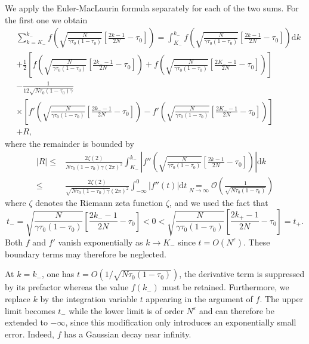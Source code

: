 \documentclass[pdflatex,sn-mathphys-num]{sn-jnl}
\theoremstyle{thmstyleone}
\numberwithin{equation}{section}
\begin{document}
We apply the Euler-MacLaurin formula separately for each of the two sums. For the first one we obtain
\begin{equation}
\begin{split}
&\sum_{k=K_-}^{k_-} f\left(\sqrt{\frac{N}{\gamma\tau_0(1-\tau_0)}}\left[\frac{2k-1}{2N}-\tau_0\right]\right)=\int_{K_-}^{k_-} f\left(\sqrt{\frac{N}{\gamma\tau_0(1-\tau_0)}}\left[\frac{2k-1}{2N}-\tau_0\right]\right)\mathrm{d}k\\
&+\frac{1}{2}\left[f\left(\sqrt{\frac{N}{\gamma\tau_0(1-\tau_0)}}\left[\frac{2k_--1}{2N}-\tau_0\right]\right)+f\left(\sqrt{\frac{N}{\gamma\tau_0(1-\tau_0)}}\left[\frac{2K_--1}{2N}-\tau_0\right]\right)\right]\\
&-\frac{1}{12\sqrt{N\tau_0(1-\tau_0)\gamma}}\\
&\times\left[f'\left(\sqrt{\frac{N}{\gamma\tau_0(1-\tau_0)}}\left[\frac{2k_--1}{2N}-\tau_0\right]\right)-f'\left(\sqrt{\frac{N}{\gamma\tau_0(1-\tau_0)}}\left[\frac{2K_--1}{2N}-\tau_0\right]\right)\right]\\
&+R,
\end{split}
\end{equation}
where the remainder is bounded by
\begin{equation}
\begin{split}
|R|\leq&\frac{2\zeta(2)}{N\tau_0(1-\tau_0)\gamma(2\pi)^2}\int_{K_-}^{k_-} \left|f''\left(\sqrt{\frac{N}{\gamma\tau_0(1-\tau_0)}}\left[\frac{2k-1}{2N}-\tau_0\right]\right)\right|\mathrm{d}k\\
\leq&\frac{2\zeta(2)}{\sqrt{N\tau_0(1-\tau_0)\gamma}(2\pi)^2}\int_{-\infty}^0\left|f''\left(t\right)\right|\mathrm{d}t\underset{N\to\infty}{=}\mathcal{O}\left(\frac{1}{\sqrt{N\tau_0(1-\tau_0)}}\right)
\end{split}
\end{equation}
where $\zeta$ denotes the Riemann zeta function $\zeta$, and we used the fact that
\begin{equation}\label{tpm.def}
t_-=\sqrt{\frac{N}{\gamma\tau_0(1-\tau_0)}}\left[\frac{2k_--1}{2N}-\tau_0\right]<0<\sqrt{\frac{N}{\gamma\tau_0(1-\tau_0)}}\left[\frac{2k_+-1}{2N}-\tau_0\right]=t_+.
\end{equation}
Both $f$ and $f'$ vanish exponentially as $k\to K_{-}$ since $t=O(N^\varepsilon)$. These boundary terms may therefore be neglected.


At $k=k_{-}$, one has $t=O(1/\sqrt{N\tau_{0}(1-\tau_{0})})$, the derivative term is suppressed by its prefactor whereas the value $f(k_{-})$ must be retained.
Furthermore, we replace $k$ by the integration variable $t$ appearing in the argument of $f$. The upper limit becomes $t_{-}$ while the lower limit is of order $N^{\varepsilon}$ and can therefore be extended to $-\infty$, since this modification only introduces an exponentially small error. Indeed, $f$ has a Gaussian decay near infinity.
\end{document}
